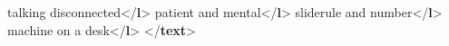 \begin{shaded}
\hspace*{1em}\mbox{}\newline 
\hspace*{1em}\hspace*{1em}talking disconnected{</\textbf{l}>}\mbox{}\newline 
\hspace*{1em}\hspace*{1em}patient and mental{</\textbf{l}>}\mbox{}\newline 
\hspace*{1em}\hspace*{1em}sliderule and number{</\textbf{l}>}\mbox{}\newline 
\hspace*{1em}\hspace*{1em}machine on a desk{</\textbf{l}>}\mbox{}\newline 
\hspace*{1em}\mbox{}\newline 
{}\mbox{}\newline 
{</\textbf{text}>}\end{shaded}\egroup\par \noindent    \par
